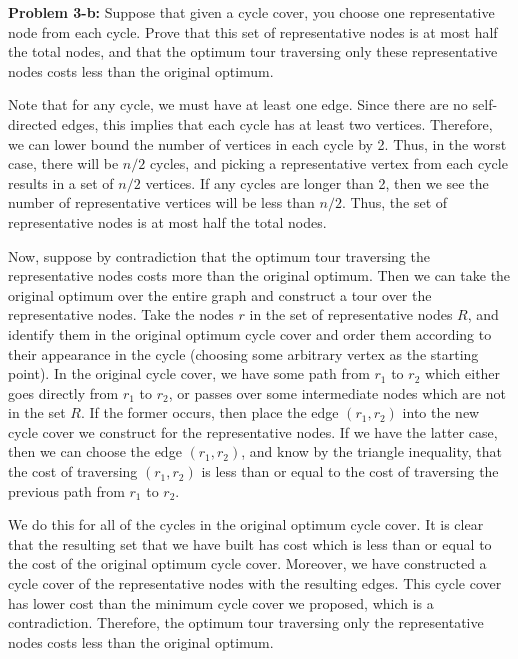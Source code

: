 \documentclass[psamsfonts]{amsart}
\newenvironment{sol}{\vspace{0.25cm}{\large \bfseries Solution:}}{\qedsymbol}
\newenvironment{prob}[1]{\begin{framed}{\large \bfseries Problem #1:}}{\end{framed}}
\begin{document}
\begin{prob}{3-b}
Suppose that given a cycle cover, you choose one representative node from each cycle. Prove that this set of representative nodes is at most half the total nodes, and that the optimum tour traversing only these representative nodes costs less than the original optimum.
\end{prob}
\begin{sol}
Note that for any cycle, we must have at least one edge. Since there are no self-directed edges, this implies that each cycle has at least two vertices. Therefore, we can lower bound the number of vertices in each cycle by 2. Thus, in the worst case, there will be $n/2$ cycles, and picking a representative vertex from each cycle results in a set of $n/2$ vertices. If any cycles are longer than 2, then we see the number of representative vertices will be less than $n/2$. Thus, the set of representative nodes is at most half the total nodes.

Now, suppose by contradiction that the optimum tour traversing the representative nodes costs more than the original optimum. Then we can take the original optimum over the entire graph and construct a tour over the representative nodes. Take the nodes $r$ in the set of representative nodes $R$, and identify them in the original optimum cycle cover and order them according to their appearance in the cycle (choosing some arbitrary vertex as the starting point). In the original cycle cover, we have some path from $r_1$ to $r_2$ which either goes directly from $r_1$ to $r_2$, or passes over some intermediate nodes which are not in the set $R$. If the former occurs, then place the edge $(r_1, r_2)$ into the new cycle cover we construct for the representative nodes. If we have the latter case, then we can choose the edge $(r_1, r_2)$, and know by the triangle inequality, that the cost of traversing $(r_1, r_2)$ is less than or equal to the cost of traversing the previous path from $r_1$ to $r_2$.

We do this for all of the cycles in the original optimum cycle cover. It is clear that the resulting set that we have built has cost which is less than or equal to the cost of the original optimum cycle cover. Moreover, we have constructed a cycle cover of the representative nodes with the resulting edges. This cycle cover has lower cost than the minimum cycle cover we proposed, which is a contradiction. Therefore, the optimum tour traversing only the representative nodes costs less than the original optimum.
\end{sol}
\end{document}
